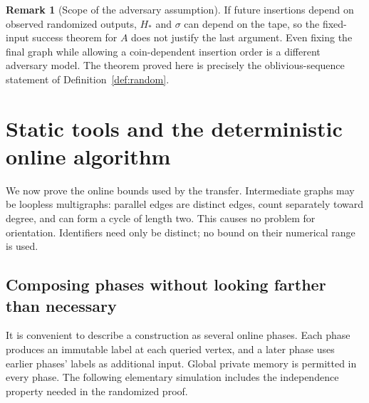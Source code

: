 \documentclass[11pt]{article}
\theoremstyle{definition}
\newtheorem{remark}[theorem]{Remark}
\begin{document}
\begin{remark}[Scope of the adversary assumption]
If future insertions depend on observed randomized outputs, $H_*$ and
$\sigma$ can depend on the tape, so the fixed-input success theorem for
$A$ does not justify the last argument. Even fixing the final graph while
allowing a coin-dependent insertion order is a different adversary model.
The theorem proved here is precisely the oblivious-sequence statement of
Definition~\ref{def:random}.
\end{remark}

\section{Static tools and the deterministic online algorithm}
\label{sec:static-tools}

We now prove the online bounds used by the transfer. Intermediate graphs
may be loopless multigraphs: parallel edges are distinct edges, count
separately toward degree, and can form a cycle of length two. This causes
no problem for orientation. Identifiers need only be distinct; no bound on
their numerical range is used.

\subsection{Composing phases without looking farther than necessary}

It is convenient to describe a construction as several online phases. Each
phase produces an immutable label at each queried vertex, and a later phase
uses earlier phases' labels as additional input. Global private memory is
permitted in every phase. The following elementary simulation includes the
independence property needed in the randomized proof.
\end{document}
